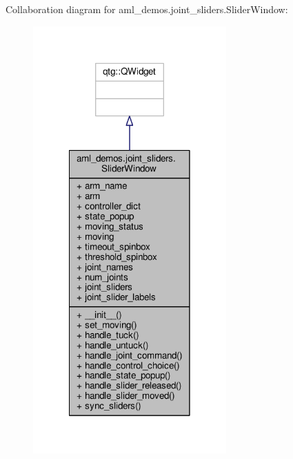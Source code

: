 Collaboration diagram for aml\-\_\-demos.\-joint\-\_\-sliders.\-Slider\-Window\-:
\nopagebreak
\begin{figure}[H]
\begin{center}
\leavevmode
\includegraphics[width=210pt]{classaml__demos_1_1joint__sliders_1_1_slider_window__coll__graph}
\end{center}
\end{figure}
